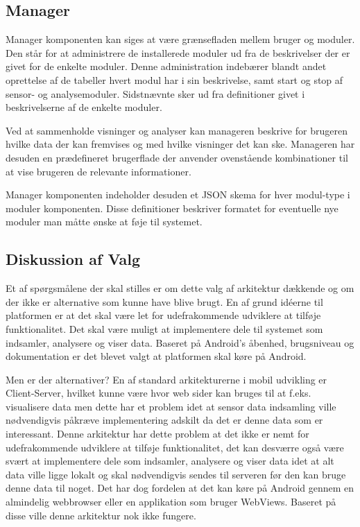 \subsection*{Manager}\label{subsec:arkitektur-Manager}
Manager komponenten kan siges at være grænsefladen mellem bruger og moduler.
Den står for at administrere de installerede moduler ud fra de beskrivelser der er givet for de enkelte moduler.
Denne administration indebærer blandt andet oprettelse af de tabeller hvert modul har i sin beskrivelse, samt start og stop af sensor- og analysemoduler.
Sidstnævnte sker ud fra definitioner givet i beskrivelserne af de enkelte moduler.

Ved at sammenholde visninger og analyser kan manageren beskrive for brugeren hvilke data der kan fremvises og med hvilke visninger det kan ske.
Manageren har desuden en prædefineret brugerflade der anvender ovenstående kombinationer til at vise brugeren de relevante informationer.

Manager komponenten indeholder desuden et JSON skema for hver modul-type i moduler komponenten.
Disse definitioner beskriver formatet for eventuelle nye moduler man måtte ønske at føje til systemet.

\subsection{Diskussion af Valg}
Et af spørgsmålene der skal stilles er om dette valg af arkitektur dækkende og om der ikke er alternative som kunne have blive brugt.
En af grund idéerne til platformen er at det skal være let for udefrakommende udviklere at tilføje funktionalitet. 
Det skal være muligt at implementere dele til systemet som indsamler, analysere og viser data.
Baseret på Android's åbenhed, brugsniveau og dokumentation er det blevet valgt at platformen skal køre på Android.

Men er der alternativer? En af standard arkitekturerne i mobil udvikling er Client-Server, hvilket kunne være hvor web sider kan bruges til at f.eks. visualisere data men dette har et problem idet at sensor data indsamling ville nødvendigvis påkræve implementering adskilt da det er denne data som er interessant.
Denne arkitektur har dette problem at det ikke er nemt for udefrakommende udviklere at tilføje funktionalitet, det kan desværre også være svært at implementere dele som indsamler, analysere og viser data idet at alt data ville ligge lokalt og skal nødvendigvis sendes til serveren før den kan bruge denne data til noget. 
Det har dog fordelen at det kan køre på Android gennem en almindelig webbrowser eller en applikation som bruger WebViews.
Baseret på disse ville denne arkitektur nok ikke fungere.

